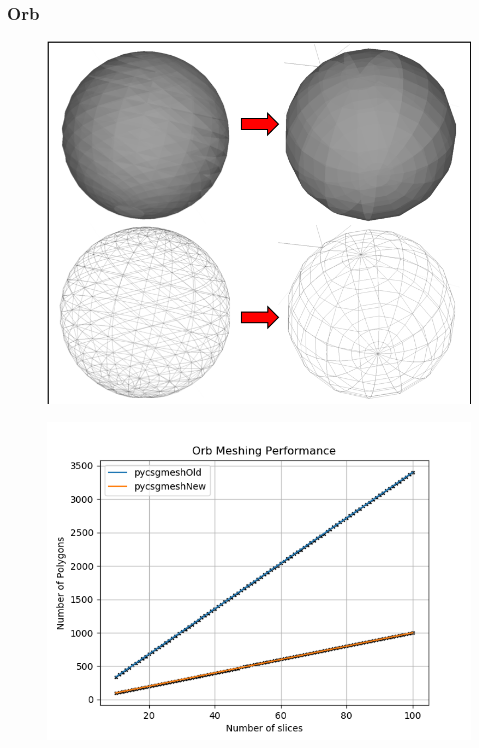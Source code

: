 \documentclass[12pt,a4paper]{article}
\begin{document}
\newpage
\subsubsection{Orb}

\begin{figure}[h!]
\centering
\begin{minipage}{.2\textwidth}
  \centering
  \includegraphics[height=0.8\linewidth]{Images//Meshes//orb.png}
  \label{fig:test1}
\end{minipage}%
\begin{minipage}{.3\textwidth}
  \centering
  \includegraphics[scale=0.35]{Images//Quad_fits//orb_quad.png}
  \label{fig:test2}
\end{minipage}%
\end{figure}
\end{document}
